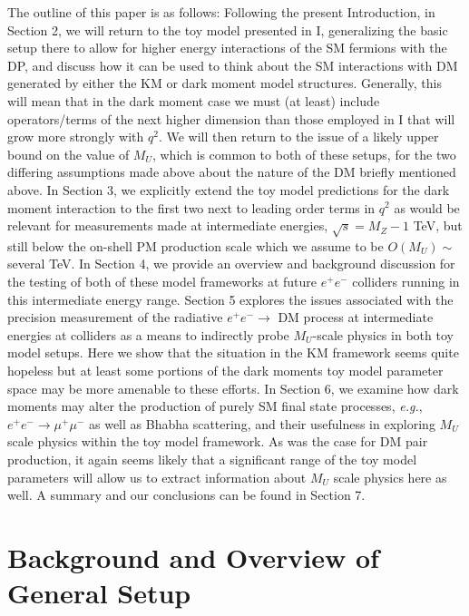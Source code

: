 \documentclass[14pt]{article}
\def\eg{{\it e.g.}}
\def\to{\rightarrow}
\begin{document}
The outline of this paper is as follows:  Following the present Introduction, in Section 2,  we will return to the toy model presented in I, generalizing the basic setup there to allow for higher energy 
interactions of the SM fermions with the DP, and discuss how it can be used to think about the SM interactions with DM generated by either the KM or dark moment model structures. 
Generally, this will mean that in the dark moment case we must (at least) include operators/terms of the next higher dimension than those employed in I that will grow more strongly with $q^2$. We will 
then return to the issue of a likely upper bound on the value of $M_U$, which is common to both of these setups, for the two differing assumptions made above about the nature of the DM briefly mentioned 
above.  In Section 3, we explicitly extend the toy model predictions for the dark moment interaction to the first two next to leading order terms in $q^2$ as would be relevant for measurements made at 
intermediate energies, $\sqrt s=M_Z-1$ TeV, but still below the on-shell PM production scale which we assume to be $O(M_U)\sim$ several TeV. In Section 4, we provide an overview and background 
discussion for the testing of both of these model frameworks at future $e^+e^-$ colliders running in this intermediate energy range.  Section 5 explores the issues associated with the precision 
measurement of the radiative $e^+e^-\to$ DM process at intermediate energies at colliders as a means to indirectly probe $M_U$-scale physics in both toy model setups. Here we show that the 
situation in the KM framework seems quite hopeless but at least some portions of the dark moments toy model parameter space may be more amenable to these efforts. In Section 6, we examine 
how dark moments may alter the production of purely SM final state processes, \eg, $e^+e^-\to \mu^+\mu^-$ as well as Bhabha scattering, and their usefulness in exploring $M_U$ scale physics within 
the toy model framework. As was the case for DM pair production,  it again seems likely that a significant range of the toy model parameters will allow us to extract information about $M_U$ 
scale physics here as well.  A summary and our conclusions can be found in Section 7. 




\section{Background and Overview of General Setup}
\end{document}
